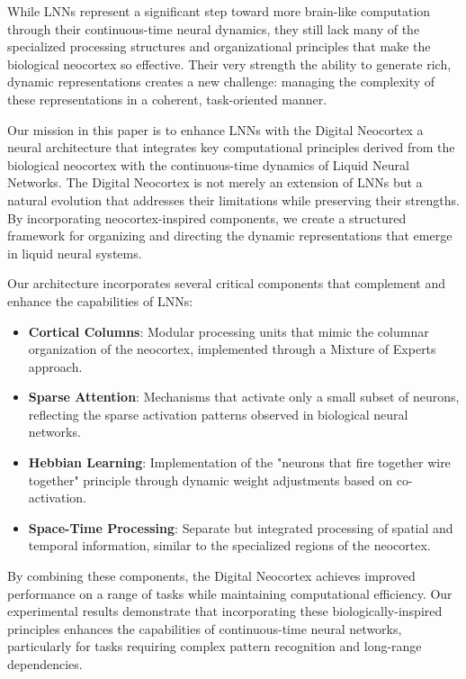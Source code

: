 \documentclass{article}
\begin{document}
While LNNs represent a significant step toward more brain-like computation through their continuous-time neural dynamics, they still lack many of the specialized processing structures and organizational principles that make the biological neocortex so effective. Their very strength the ability to generate rich, dynamic representations creates a new challenge: managing the complexity of these representations in a coherent, task-oriented manner.

Our mission in this paper is to enhance LNNs with the Digital Neocortex a neural architecture that integrates key computational principles derived from the biological neocortex with the continuous-time dynamics of Liquid Neural Networks. The Digital Neocortex is not merely an extension of LNNs but a natural evolution that addresses their limitations while preserving their strengths. By incorporating neocortex-inspired components, we create a structured framework for organizing and directing the dynamic representations that emerge in liquid neural systems.

Our architecture incorporates several critical components that complement and enhance the capabilities of LNNs:

\begin{itemize}
    \item \textbf{Cortical Columns}: Modular processing units that mimic the columnar organization of the neocortex, implemented through a Mixture of Experts approach.
    \item \textbf{Sparse Attention}: Mechanisms that activate only a small subset of neurons, reflecting the sparse activation patterns observed in biological neural networks.
    \item \textbf{Hebbian Learning}: Implementation of the "neurons that fire together wire together" principle through dynamic weight adjustments based on co-activation.
    \item \textbf{Space-Time Processing}: Separate but integrated processing of spatial and temporal information, similar to the specialized regions of the neocortex.
\end{itemize}

By combining these components, the Digital Neocortex achieves improved performance on a range of tasks while maintaining computational efficiency. Our experimental results demonstrate that incorporating these biologically-inspired principles enhances the capabilities of continuous-time neural networks, particularly for tasks requiring complex pattern recognition and long-range dependencies.
\end{document}
